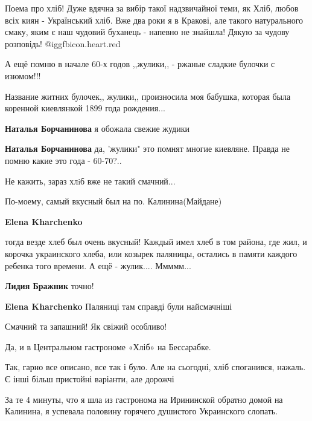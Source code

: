 \begin{itemize}

Поема про хліб! Дуже вдячна за вибір такої надзвичайної теми, як Хліб, любов
всіх киян - Український хліб. Вже два роки я в Кракові, але такого натурального
смаку, яким є наш чудовий буханець - напевно не знайшла! Дякую за чудову
розповідь! @igg{fbicon.heart.red}



А ещё помню в начале 60-х годов ,,жулики,, - ржаные сладкие булочки с изюмом!!!

Название житних булочек,, жулики,, произносила моя бабушка, которая была
коренной киевлянкой 1899 года рождения...

\begin{itemize} %
\textbf{Наталья Борчанинова} я обожала свежие жудики

\textbf{Наталья Борчанинова} да, 'жулики" это помнят многие киевляне. Правда не помню какие это года - 60-70?..
\end{itemize} %

Не кажить, зараз хлiб вже не такий смачний...

По-моему, самый вкусный был на по. Калинина(Майдане)

\begin{itemize} %
\textbf{Elena Kharchenko} 

тогда везде хлеб был очень вкусный! Каждый имел хлеб в том района, где жил, и
корочка украинского хлеба, или козырек паляницы, остались в памяти каждого
ребенка того времени. А ещё - жулик.... Ммммм...

\textbf{Лидия Бражник} точно!

\textbf{Elena Kharchenko} Паляниці там справді були найсмачніші
\end{itemize} %

Смачний та запашний! Як свіжий особливо!

Да, и в Центральном гастрономе «Хліб» на Бессарабке.


Так, гарно все описано, все так і було. Але на сьогодні, хліб споганився,
нажаль. Є інші більш пристойні варіанти, але дорожчі



За те 4 минуты, что я шла из гастронома на Ирининской обратно домой на
Калинина, я успевала половину горячего душистого Украинского слопать.


\end{itemize} %

